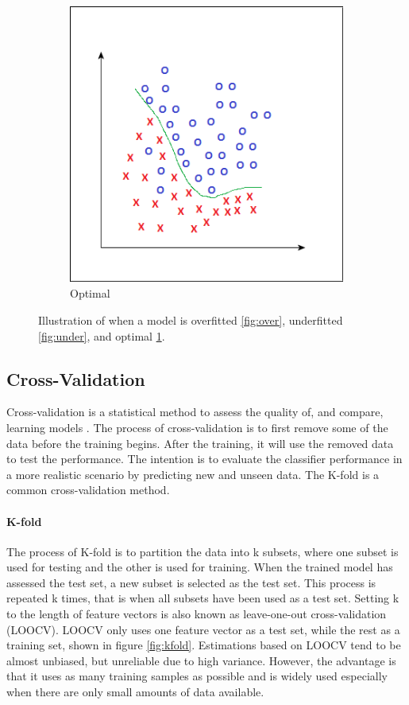 \documentclass[USenglish]{ifimaster}  %
\begin{document}
\begin{figure}[h]
\begin{subfigure}{\linewidth}
			\includegraphics[scale=0.4]{Figures/Finefitting}
			\caption{Optimal}
			\label{fig:optimal}
		\end{subfigure}
		\caption[Illustration of when a model is overfitted, underfitted and optimal]{Illustration of when a model is overfitted \ref{fig:over}, underfitted \ref{fig:under}, and optimal \ref{fig:optimal}.}
		\label{fig:fitting}	
	\end{figure}
	
	\FloatBarrier
	
\subsection{Cross-Validation}
Cross-validation is a statistical method to assess the quality of, and compare, learning models \cite{Refaeilzadeh2009}. The process of cross-validation is to first remove some of the data before the training begins. After the training, it will use the removed data to test the performance. The intention is to evaluate the classifier performance in a more realistic scenario by predicting new and unseen data. The K-fold is a common cross-validation method.
	
\paragraph{K-fold}
The process of K-fold is to partition the data into k subsets, where one subset is used for testing and the other is used for training. When the trained model has assessed the test set, a new subset is selected as the test set. This process is repeated k times, that is when all subsets have been used as a test set. Setting k to the length of feature vectors is also known as leave-one-out cross-validation (LOOCV). LOOCV only uses one feature vector as a test set, while the rest as a training set, shown in figure \ref{fig:kfold}. Estimations based on LOOCV tend to be almost unbiased, but unreliable due to high variance. However, the advantage is that it uses as many training samples as possible and is widely used especially when there are only small amounts of data available.
\end{document}
